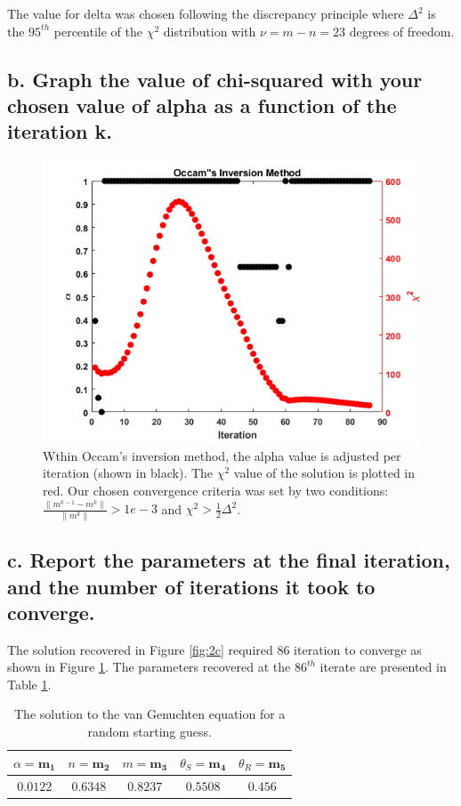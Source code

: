 \documentclass{article}
\begin{document}
The value for delta was chosen following the discrepancy principle where $\Delta^2$ is the $95^{th}$ percentile of the $\chi^2$ distribution with $\nu = m - n = 23$ degrees of freedom.

\subsection*{b. Graph the value of chi-squared with your chosen value of alpha as a function of the iteration k.}
\begin{figure}
    \centering
    \includegraphics[width = \textwidth]{2bb.png}
    \caption{Wthin Occam's inversion method, the alpha value is adjusted per iteration (shown in black). The $\chi^2$ value of the solution is plotted in red. Our chosen convergence criteria was set by two conditions: $\frac{\|m^{k-1}-m^{k}\|}{\|m^{k}\|} > 1e-3$ and $\chi^2 > \frac{1}{2}\Delta^2$.}
    \label{fig:2b}
\end{figure}

\subsection*{c. Report the parameters at the final iteration, and the number of iterations it took to converge.}
The solution recovered in Figure \ref{fig:2c} required 86 iteration to converge as shown in Figure \ref{fig:2b}. The parameters recovered at the $86^{th}$ iterate are presented in Table \ref{tab:2}.
\begin{table}[!h]
\begin{center}
\begin{tabular}{|c|c|c|c|c|}
\hline
$\alpha = \mathbf{m_1}$ & $n = \mathbf{m_2}$ & $m = \mathbf{m_3}$ & $\theta_S = \mathbf{m_4}$ & $\theta_R = \mathbf{m_5}$ \\ \hline
$0.0122$                & $0.6348$           & $0.8237$           & $0.5508$                  & $0.456$                   \\ \hline
\end{tabular}
\caption{The solution to the van Genuchten equation for a random starting guess.}
\label{tab:2}
\end{center}
\end{table}
\end{document}
